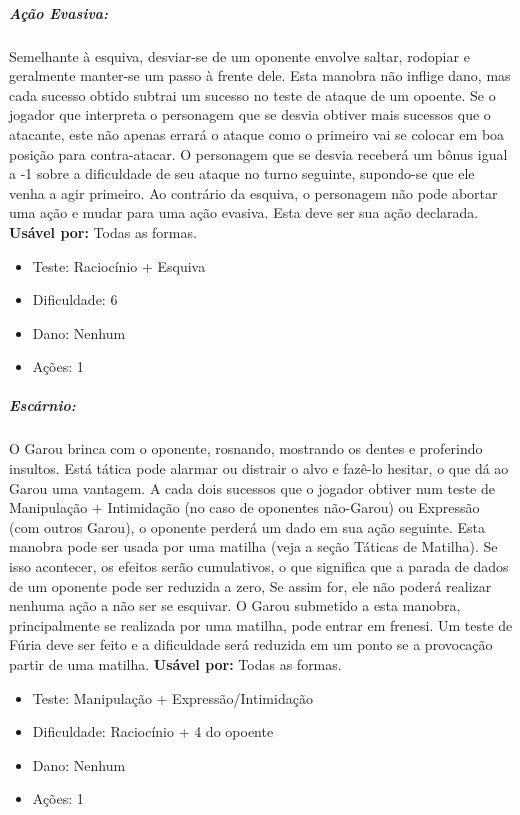 
\subparagraph{\bf Ação Evasiva:}
Semelhante à esquiva, desviar-se de um oponente envolve saltar, rodopiar e geralmente manter-se um passo à frente dele. Esta manobra não inflige dano, mas cada sucesso obtido subtrai um sucesso no teste de ataque de um opoente. Se o jogador que interpreta o personagem que se desvia obtiver mais sucessos que o atacante, este não apenas errará o ataque como o primeiro vai se colocar em boa posição para contra-atacar. O personagem que se desvia receberá um bônus igual a -1 sobre a dificuldade de seu ataque no turno seguinte, supondo-se que ele venha a agir primeiro.
Ao contrário da esquiva, o personagem não pode abortar uma ação e mudar para uma ação evasiva. Esta deve ser sua ação declarada.
{\bf Usável por:} Todas as formas.
\begin{itemize}[noitemsep]
\item Teste: Raciocínio + Esquiva
\item Dificuldade: 6
\item Dano: Nenhum
\item Ações: 1
\end{itemize}

\subparagraph{\bf Escárnio:}
O Garou brinca com o oponente, rosnando, mostrando os dentes e proferindo insultos. Está tática pode alarmar ou distrair o alvo e fazê-lo hesitar, o que dá ao Garou uma vantagem. A cada dois sucessos que o jogador obtiver num teste de Manipulação + Intimidação (no caso de oponentes não-Garou) ou Expressão (com outros Garou), o oponente perderá um dado em sua ação seguinte.
Esta manobra pode ser usada por uma matilha (veja a seção Táticas de Matilha). Se isso acontecer, os efeitos serão cumulativos, o que significa que a parada de dados de um oponente pode ser reduzida a zero, Se assim for, ele não poderá realizar nenhuma ação a não ser se esquivar.
O Garou submetido a esta manobra, principalmente se realizada por uma matilha, pode entrar em frenesi. Um teste de Fúria deve ser feito e a dificuldade será reduzida em um ponto se a provocação partir de uma matilha.
{\bf Usável por:} Todas as formas.
\begin{itemize}[noitemsep]
\item Teste: Manipulação + Expressão/Intimidação
\item Dificuldade: Raciocínio + 4 do opoente
\item Dano: Nenhum
\item Ações: 1
\end{itemize}

